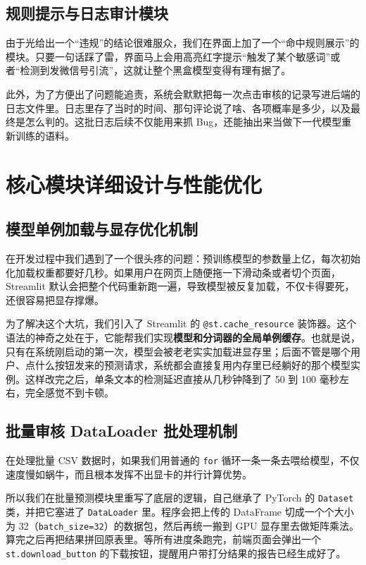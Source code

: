 \documentclass[twoside]{thesis-cls-Miya} %
\begin{document}
\subsection{规则提示与日志审计模块}
由于光给出一个“违规”的结论很难服众，我们在界面上加了一个“命中规则展示”的模块。只要一句话踩了雷，界面马上会用高亮红字提示“触发了某个敏感词”或者“检测到发微信号引流”，这就让整个黑盒模型变得有理有据了。

此外，为了方便出了问题能追责，系统会默默把每一次点击审核的记录写进后端的日志文件里。日志里存了当时的时间、那句评论说了啥、各项概率是多少，以及最终是怎么判的。这批日志后续不仅能用来抓 Bug，还能抽出来当做下一代模型重新训练的语料。

\section{核心模块详细设计与性能优化}
\subsection{模型单例加载与显存优化机制}
在开发过程中我们遇到了一个很头疼的问题：预训练模型的参数量上亿，每次初始化加载权重都要好几秒。如果用户在网页上随便拖一下滑动条或者切个页面，Streamlit 默认会把整个代码重新跑一遍，导致模型被反复加载，不仅卡得要死，还很容易把显存撑爆。

为了解决这个大坑，我们引入了 Streamlit 的 \texttt{@st.cache\_resource} 装饰器。这个语法的神奇之处在于，它能帮我们实现\textbf{模型和分词器的全局单例缓存}。也就是说，只有在系统刚启动的第一次，模型会被老老实实加载进显存里；后面不管是哪个用户、点什么按钮发来的预测请求，系统都会直接复用内存里已经躺好的那个模型实例。这样改完之后，单条文本的检测延迟直接从几秒钟降到了 50 到 100 毫秒左右，完全感觉不到卡顿。

\subsection{批量审核 DataLoader 批处理机制}
在处理批量 CSV 数据时，如果我们用普通的 \texttt{for} 循环一条一条去喂给模型，不仅速度慢如蜗牛，而且根本发挥不出显卡的并行计算优势。

所以我们在批量预测模块里重写了底层的逻辑，自己继承了 PyTorch 的 \texttt{Dataset} 类，并把它塞进了 \texttt{DataLoader} 里。程序会把上传的 DataFrame 切成一个个大小为 32（\texttt{batch\_size=32}）的数据包，然后再统一搬到 GPU 显存里去做矩阵乘法。算完之后再把结果拼回原表里。等所有进度条跑完，前端页面会弹出一个 \texttt{st.download\_button} 的下载按钮，提醒用户带打分结果的报告已经生成好了。
\end{document}
